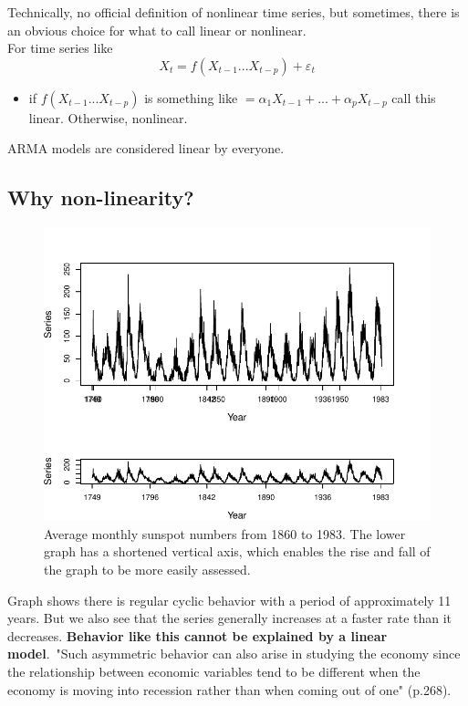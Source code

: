 Technically, no official definition of nonlinear time series, but sometimes, there is an obvious choice for what to call linear or nonlinear. \\

For time series like \[X_t = f(X_{t-1} ... X_{t-p}) + \varepsilon_t \]
\begin{itemize}
    \item if $f(X_{t-1} ... X_{t-p})$ is something like $ =\alpha_1 X_{t-1} + ...+ \alpha_p X_{t-p}$ call this linear. Otherwise, nonlinear.
\end{itemize}
ARMA models are considered linear by everyone. 

\subsection{Why non-linearity?}

\begin{figure}[H]
\centering
\includegraphics[scale=0.8]{plots/sunpots.pdf}
\caption{Average monthly sunspot numbers from 1860 to 1983. The lower graph has a shortened vertical axis, which enables the rise and fall of the graph to be more easily assessed.}
\end{figure}

Graph shows there is regular cyclic behavior with a period of approximately 11 years. But we also see that the series generally increases at a faster rate than it decreases. \textbf{Behavior like this cannot be explained by a linear model}.\
"Such asymmetric behavior can also arise in studying the economy since the relationship between economic variables tend to be different when the economy is moving into recession rather than when coming out of one" (p.268). \\

